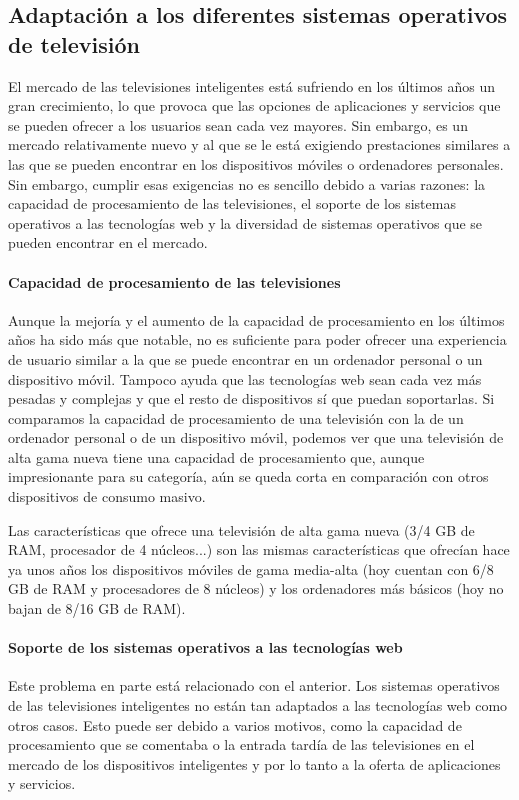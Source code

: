 \subsection{Adaptación a los diferentes sistemas operativos de televisión}
\label{sec:adaptacion}

El mercado de las televisiones inteligentes está sufriendo en los últimos años un gran crecimiento, lo que provoca 
que las opciones de aplicaciones y servicios que se pueden ofrecer a los usuarios sean cada vez mayores. Sin embargo,
es un mercado relativamente nuevo y al que se le está exigiendo prestaciones similares a las que se pueden encontrar
en los dispositivos móviles o ordenadores personales. Sin embargo, cumplir esas exigencias no es sencillo debido a 
varias razones: la capacidad de procesamiento de las televisiones, el soporte de los sistemas operativos a las  
tecnologías web y la diversidad de sistemas operativos que se pueden encontrar en el mercado.

\paragraph{Capacidad de procesamiento de las televisiones}
Aunque la mejoría y el aumento de la capacidad de procesamiento en los últimos años ha sido más que notable, no es 
suficiente para poder ofrecer una experiencia de usuario similar a la que se puede encontrar en un ordenador personal
 o un dispositivo móvil. Tampoco ayuda que las tecnologías web sean cada vez más pesadas y complejas y que el resto de 
 dispositivos sí que puedan soportarlas. Si comparamos la capacidad de procesamiento de una televisión con la de un 
 ordenador personal o de un dispositivo móvil, podemos ver que una televisión de alta gama nueva tiene una capacidad 
 de procesamiento que, aunque impresionante para su categoría, aún se queda corta en comparación con otros dispositivos 
 de consumo masivo.

 Las características que ofrece una televisión de alta gama nueva (3/4 GB de RAM, procesador de 4 núcleos...) son las 
 mismas características que ofrecían hace ya unos años los dispositivos móviles de gama media-alta (hoy cuentan
 con 6/8 GB de RAM y procesadores de 8 núcleos) y los ordenadores más básicos (hoy no bajan de 8/16 GB de RAM). 

\paragraph{Soporte de los sistemas operativos a las tecnologías web}
Este problema en parte está relacionado con el anterior. Los sistemas operativos de las televisiones inteligentes
no están tan adaptados a las tecnologías web como otros casos. Esto puede ser debido a varios motivos, como 
la capacidad de procesamiento que se comentaba o la entrada tardía de las televisiones en el mercado de los
dispositivos inteligentes y por lo tanto a la oferta de aplicaciones y servicios. 

